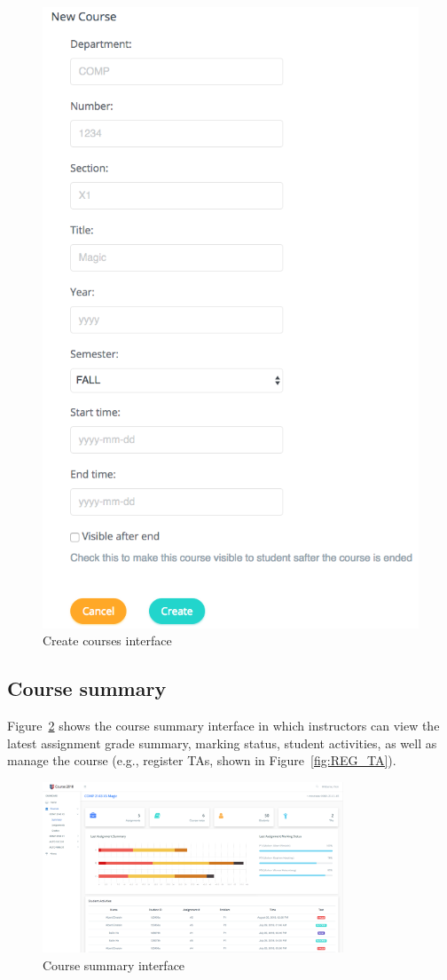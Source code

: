 \begin{figure}[H]
    \centering
        \includegraphics[width=.6\textwidth]{figures/create-courses}
    \caption{Create courses interface}
    \label{fig:NEW_COURSE}
\end{figure}

\subsection{Course summary}
Figure~\ref{fig:COURSE_SUMMARY} shows the course summary interface in which
instructors can view the latest assignment grade summary, marking status,
student activities, as well as manage the course (e.g., register TAs, shown
in Figure~\ref{fig:REG_TA}).

\begin{figure}[H]
    \centering
        \includegraphics[width=0.8\textwidth]{figures/course-summary}
    \caption{Course summary interface}
    \label{fig:COURSE_SUMMARY}
\end{figure}

